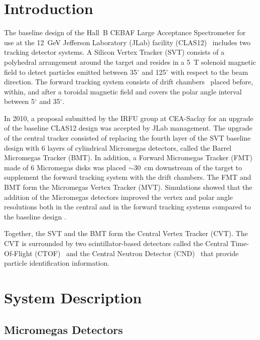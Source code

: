 \section{Introduction}

The baseline design of the Hall~B CEBAF Large Acceptance Spectrometer for use at the 12~GeV Jefferson Laboratory
(JLab) facility (CLAS12)~\cite{clas12-nim} includes two tracking detector systems. A Silicon Vertex Tracker (SVT)
\cite{svt-nim} consists of a polyhedral arrangement around the target and resides in a 5~T solenoid magnetic field to
detect particles emitted between 35$^\circ$ and 125$^\circ$ with respect to the beam direction. The forward tracking
system consists of drift chambers~\cite{dc-nim} placed before, within, and after a toroidal magnetic field and covers
the polar angle interval between 5$^\circ$ and 35$^\circ$. 

In 2010, a proposal submitted by the IRFU group at CEA-Saclay for an upgrade of the baseline CLAS12 design was
accepted by JLab management. The upgrade of the central tracker consisted of replacing the fourth layer of the SVT
baseline design with 6 layers of cylindrical Micromegas detectors, called the Barrel Micromegas Tracker (BMT). In
addition, a Forward Micromegas Tracker (FMT) made of 6 Micromegas disks was placed $\sim$30~cm downstream of
the target to supplement the forward tracking system with the drift chambers. The FMT and BMT form the Micromegas
Vertex Tracker (MVT). Simulations showed that the addition of the Micromegas detectors improved the vertex and polar
angle resolutions both in the central and in the forward tracking systems compared to the baseline design
\cite{CLAS-NOTE2007-004,CLAS-NOTE2010-003}.

Together, the SVT and the BMT form the Central Vertex Tracker (CVT). The CVT is surrounded by two scintillator-based
detectors called the Central Time-Of-Flight (CTOF)~\cite{ctof-nim} and the Central Neutron Detector (CND)~\cite{cnd-nim}
that provide particle identification information.

\section{System Description}

\subsection{Micromegas Detectors}

